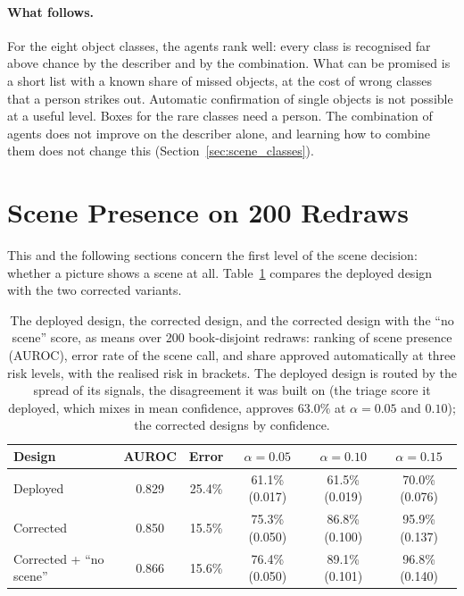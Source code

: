 \paragraph{What follows.} For the eight object classes, the agents rank well: every class is recognised far above chance by the describer and by the combination. What can be promised is a short list with a known share of missed objects, at the cost of wrong classes that a person strikes out. Automatic confirmation of single objects is not possible at a useful level. Boxes for the rare classes need a person. The combination of agents does not improve on the describer alone, and learning how to combine them does not change this (Section~\ref{sec:scene_classes}).

\section{Scene Presence on 200 Redraws}
\label{sec:corrected_results}

This and the following sections concern the first level of the scene decision: whether a picture shows a scene at all. Table~\ref{tab:corrected_200} compares the deployed design with the two corrected variants.

\begin{table}[!htbp]
\centering
\caption[Scene presence: deployed and corrected designs]{The deployed design, the corrected design, and the corrected design with the ``no scene'' score, as means over 200 book-disjoint redraws: ranking of scene presence (AUROC), error rate of the scene call, and share approved automatically at three risk levels, with the realised risk in brackets. The deployed design is routed by the spread of its signals, the disagreement it was built on (the triage score it deployed, which mixes in mean confidence, approves $63.0\%$ at $\alpha=0.05$ and $0.10$); the corrected designs by confidence.}
\label{tab:corrected_200}
\small
\begin{tabular}{lccccc}
\toprule
Design & AUROC & Error & $\alpha=0.05$ & $\alpha=0.10$ & $\alpha=0.15$ \\
\midrule
Deployed & 0.829 & 25.4\% & 61.1\% (0.017) & 61.5\% (0.019) & 70.0\% (0.076) \\
Corrected & 0.850 & 15.5\% & 75.3\% (0.050) & 86.8\% (0.100) & 95.9\% (0.137) \\
Corrected + ``no scene'' & 0.866 & 15.6\% & 76.4\% (0.050) & 89.1\% (0.101) & 96.8\% (0.140) \\
\bottomrule
\end{tabular}
\end{table}

